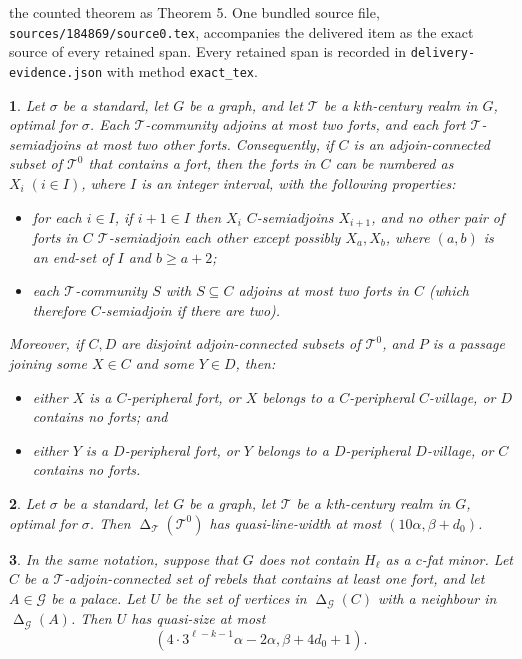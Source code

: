 \documentclass[10pt,a4paper]{amsart}
\theoremstyle{plain}
\newtheorem{thm}{}
\newcommand{\voro}{\operatorname{\Delta}}
\newcommand{\mac}{\mathcal}
\newcommand{\mac}{\mathcal}
\newcommand{\voro}{\operatorname{\Delta}}
\begin{document}
the counted theorem as Theorem 5. One bundled source file, \texttt{sources/184869/source0.tex}, accompanies the delivered item as the exact source of every retained span. Every retained span is recorded in \texttt{delivery-evidence.json} with method \texttt{exact\_tex}.
	\begin{thm}\label{contactgraph}
		Let $\sigma$ be a standard, let
		$G$ be a graph, and
		let $\mathcal{T}$ be a $k$th-century realm in $G$, optimal for $\sigma$. 
		Each $\mac T$-community adjoins at most two forts, and 
		each fort $\mac T$-semiadjoins at most two other forts. Consequently, if 
		$C$ is an adjoin-connected subset of $\mac T^0$ that contains a fort, then  
		the forts in $C$ can be numbered as $X_i\;(i\in I)$, where $I$ is an integer interval, with the following properties:
		\begin{itemize}
			\item for each $i\in I$, if $i+1\in I$ then $X_i$ $C$-semiadjoins $X_{i+1}$, and no other pair of forts in $C$  $\mac T$-semiadjoin  each other 
			except possibly $X_a,X_b$, where $(a,b)$ is an end-set of $I$ and $b\ge a+2$;
			\item each $\mac T$-community  $S$  with $S\subseteq C$ adjoins at most two forts in $C$ (which therefore $C$-semiadjoin if there are two).
		\end{itemize}
		Moreover, if $C,D$ are disjoint adjoin-connected subsets of $\mac T^0$, and $P$ is a passage joining some $X\in C$ and some  $Y\in D$,
		then:
		\begin{itemize}
			\item  either $X$ is a $C$-peripheral fort, or $X$ belongs to a $C$-peripheral $C$-village, or $D$ contains no forts; and 
			\item either $Y$ 
			is a $D$-peripheral fort, or $Y$ belongs to a $D$-peripheral $D$-village,
			or $C$ contains no forts.
		\end{itemize}
	\end{thm}

	\begin{thm}\label{smallcoarsepw}
		Let $\sigma$ be a standard, let
		$G$ be a graph,
		let $\mathcal{T}$ be a $k$th-century realm in $G$, optimal for $\sigma$.
		Then $\voro_{\mac T} (\mac T^0)$
		has quasi-line-width at most
		$(10\alpha,\beta+d_0)$.
	\end{thm}

	\begin{thm}\label{palacebound}
		In the same notation, suppose that $G$ does not contain $H_\ell$ as a $c$-fat minor. Let $C$ be a $\mac T$-adjoin-connected set of rebels that contains at least
		one fort, and let $A\in \mac G$ be a palace.
		Let $U$ be the set of vertices in $\voro_{\mac G}(C)$ with a neighbour in  $\voro_{\mac G}(A)$.
		Then $U$ has quasi-size at most
		$$\left(4\cdot 3^{\ell-k-1}\alpha-2\alpha, \beta+4d_0+1\right).$$
	\end{thm}
\end{document}
